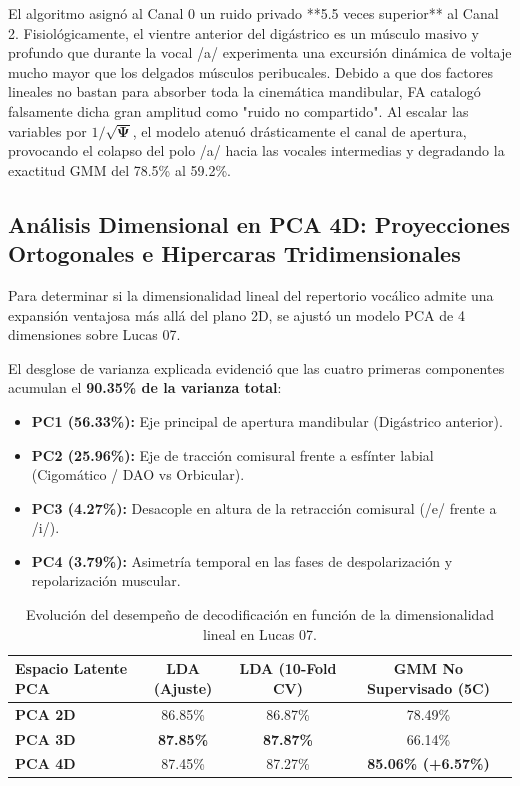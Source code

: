 \documentclass[11pt,a4paper,openany]{book}
\theoremstyle{definition}
\begin{document}
El algoritmo asignó al Canal 0 un ruido privado **5.5 veces superior** al Canal 2. Fisiológicamente, el vientre anterior del digástrico es un músculo masivo y profundo que durante la vocal /a/ experimenta una excursión dinámica de voltaje mucho mayor que los delgados músculos peribucales. Debido a que dos factores lineales no bastan para absorber toda la cinemática mandibular, FA catalogó falsamente dicha gran amplitud como "ruido no compartido". Al escalar las variables por $1 / \sqrt{\boldsymbol{\Psi}}$, el modelo atenuó drásticamente el canal de apertura, provocando el colapso del polo /a/ hacia las vocales intermedias y degradando la exactitud GMM del 78.5\% al 59.2\%.

\subsection{Análisis Dimensional en PCA 4D: Proyecciones Ortogonales e Hipercaras Tridimensionales}
\label{subsec:pca_4d_proyecciones_cubos}

Para determinar si la dimensionalidad lineal del repertorio vocálico admite una expansión ventajosa más allá del plano 2D, se ajustó un modelo PCA de 4 dimensiones sobre Lucas 07.

El desglose de varianza explicada evidenció que las cuatro primeras componentes acumulan el \textbf{90.35\% de la varianza total}:
\begin{itemize}
    \item \textbf{PC1 (56.33\%):} Eje principal de apertura mandibular (Digástrico anterior).
    \item \textbf{PC2 (25.96\%):} Eje de tracción comisural frente a esfínter labial (Cigomático / DAO vs Orbicular).
    \item \textbf{PC3 (4.27\%):} Desacople en altura de la retracción comisural (/e/ frente a /i/).
    \item \textbf{PC4 (3.79\%):} Asimetría temporal en las fases de despolarización y repolarización muscular.
\end{itemize}

\begin{table}[H]
\centering
\small
\begin{tabular}{lccc}
\toprule
\textbf{Espacio Latente PCA} & \textbf{LDA (Ajuste)} & \textbf{LDA (10-Fold CV)} & \textbf{GMM No Supervisado (5C)} \\
\midrule
\textbf{PCA 2D} & 86.85\% & 86.87\% & 78.49\% \\
\textbf{PCA 3D} & \textbf{87.85\%} & \textbf{87.87\%} & 66.14\% \\
\textbf{PCA 4D} & 87.45\% & 87.27\% & \textbf{85.06\% (+6.57\%)} \\
\bottomrule
\end{tabular}
\caption{Evolución del desempeño de decodificación en función de la dimensionalidad lineal en Lucas 07.}
\label{tab:pca_dimensionalidad_lucas}
\end{table}
\end{document}
